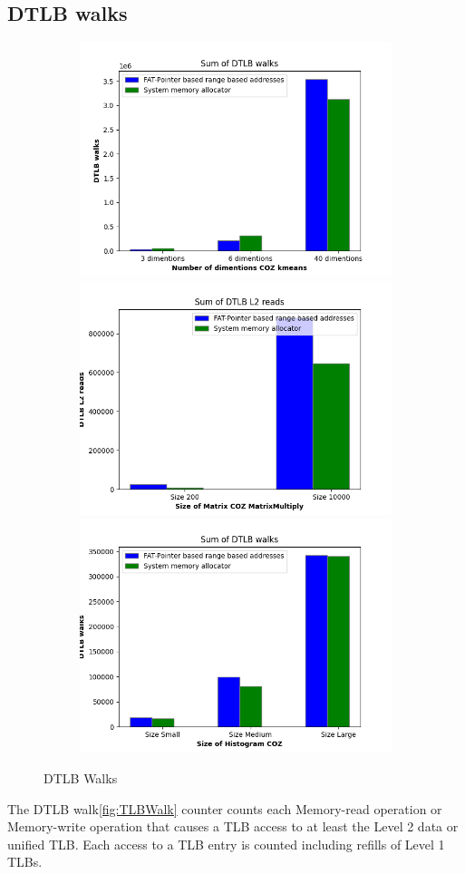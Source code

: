\subsection{DTLB walks}
\begin{figure}
  \begin{subfigure}{\linewidth}
    \includegraphics[width=.5\linewidth]{tlb-walk-kmeans.png}\hfill
    \includegraphics[width=.5\linewidth]{tlb-walk-matrixmultiply.png}\hfill
    \includegraphics[width=.5\linewidth]{tlb-walk-histogram.png}
\end{subfigure}
\caption{DTLB Walks}
\label{TLBWalk}
\end{figure}

The DTLB walk\ref{fig:TLBWalk} counter counts each Memory-read operation or Memory-write operation that causes a 
TLB access to at least the Level 2 data or unified TLB.
Each access to a TLB entry is counted including refills 
of Level 1 TLBs.

